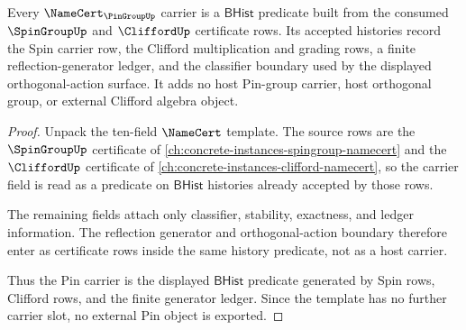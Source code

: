 \begin{theorem}
\label{thm:pingroup-bhist-carrier-obligation}
Every $\NameCert_{\PinGroupUp}$ carrier is a $\mathsf{BHist}$ predicate built
from the consumed $\SpinGroupUp$ and $\CliffordUp$ certificate rows. Its
accepted histories record the Spin carrier row, the Clifford multiplication
and grading rows, a finite reflection-generator ledger, and the classifier
boundary used by the displayed orthogonal-action surface. It adds no host
Pin-group carrier, host orthogonal group, or external Clifford algebra object.
\end{theorem}
\begin{proof}
Unpack the ten-field $\NameCert$ template. The source rows are the
$\SpinGroupUp$ certificate of
\autoref{ch:concrete-instances-spingroup-namecert} and the $\CliffordUp$
certificate of \autoref{ch:concrete-instances-clifford-namecert}, so the
carrier field is read as a predicate on $\mathsf{BHist}$ histories already
accepted by those rows.

The remaining fields attach only classifier, stability, exactness, and ledger
information. The reflection generator and orthogonal-action boundary therefore
enter as certificate rows inside the same history predicate, not as a host
carrier.

Thus the Pin carrier is the displayed $\mathsf{BHist}$ predicate generated by
Spin rows, Clifford rows, and the finite generator ledger. Since the template
has no further carrier slot, no external Pin object is exported.
\end{proof}

